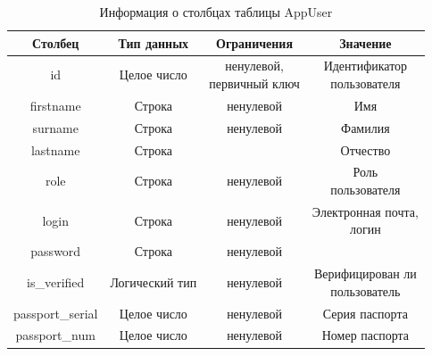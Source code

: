\begin{table}[H]
	\begin{center}
		\caption{Информация о столбцах таблицы AppUser}
		\begin{tabular}{|c|c|c|c|}
			\hline
			Столбец & Тип данных & Ограничения & Значение \\
			\hline
			id & Целое число & \makecell{ненулевой, \\ первичный ключ} & \makecell{Идентификатор \\ пользователя} \\
			\hline
			firstname & Строка & ненулевой & Имя \\
			\hline
			surname & Строка & ненулевой & Фамилия \\
			\hline
			lastname & Строка & & Отчество\\
			\hline
			role & Строка & ненулевой & \makecell{Роль \\ пользователя}\\
			\hline
			login & Строка & ненулевой & \makecell{Электронная почта, \\ логин}\\
			\hline
			password & Строка & ненулевой & \makecell{Пароль} \\
			\hline
			is\_verified & Логический тип & ненулевой & \makecell{Верифицирован ли \\ пользователь} \\
			\hline
			passport\_serial & Целое число & ненулевой & Серия паспорта \\
			\hline
            passport\_num & Целое число & ненулевой & Номер паспорта \\
			\hline
		\end{tabular}
		\label{table:db:users}
	\end{center}
\end{table}


